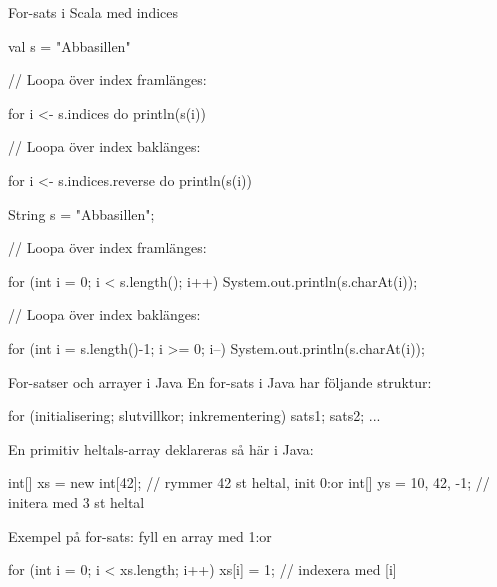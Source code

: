 \begin{Slide}{For-sats i Scala med indices}
\begin{multicols}{2}
\noindent{}
\begin{CodeSmall}[basicstyle=\ttfamily\SlideFontSize{6}{8},backgroundcolor=\color{white},
  frame=none]
val s = "Abbasillen"

// Loopa över index framlänges:

for i <- s.indices do
  println(s(i))


// Loopa över index baklänges:

for i <- s.indices.reverse do
  println(s(i))

\end{CodeSmall}

\columnbreak

\noindent{}
\begin{CodeSmall}[language=Java,basicstyle=\footnotesize\ttfamily\SlideFontSize{6}{8},backgroundcolor=\color{white},
  frame=none]
String s = "Abbasillen";

// Loopa över index framlänges:

for (int i = 0; i < s.length(); i++) {
    System.out.println(s.charAt(i));
}

// Loopa över index baklänges:

for (int i = s.length()-1; i >= 0; i--) {
    System.out.println(s.charAt(i));
}
\end{CodeSmall}
\end{multicols}
\end{Slide}


\begin{Slide}{For-satser och arrayer i Java}\SlideFontSmall
En for-sats i Java har följande struktur:
\begin{Code}[language=Java, basicstyle=\fontsize{10}{12}\ttfamily\selectfont]
for (initialisering; slutvillkor; inkrementering) {
    sats1;
    sats2;
    ...
}
\end{Code}
En primitiv heltals-array deklareras så här i Java:
\begin{Code}[language=Java, basicstyle=\fontsize{9}{11}\ttfamily\selectfont]
int[] xs = new int[42];  // rymmer 42 st heltal, init 0:or
int[] ys = {10, 42, -1}; // initera med 3 st heltal
\end{Code}
Exempel på for-sats: fyll en array med 1:or
\begin{Code}[language=Java, basicstyle=\fontsize{9}{11}\ttfamily\selectfont]
for (int i = 0; i < xs.length; i++){ 
  xs[i] = 1;    // indexera med [i]
}
\end{Code}

\end{Slide}
  

